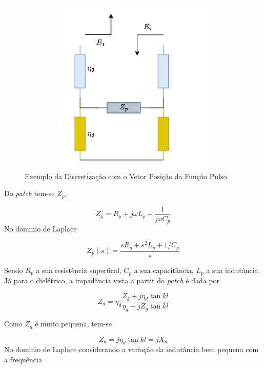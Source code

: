 \documentclass[
	12pt,				%
	openright,			%
	oneside,			%
	a4paper,			%
	english,			%
	brazil				%
	]{abntex2}
\begin{document}
\begin{figure}[htb]
 \label{PulsosVetorPosicaoIlustracao}
 \centering
  \begin{minipage}{\textwidth}
    \centering
    \caption{Exemplo da Discretização com o Vetor Posição da Função Pulso} \label{fig_minipage_imagem2}
    \includegraphics[width=14cm, height=8.5cm]{figures/AirTL2.png}
  \end{minipage}
  \hfill

\end{figure}
Do \textit{patch} tem-se $Z_p$,

\begin{equation}
Z_p=R_p+j\omega L_p+\frac{1}{j\omega C_p}
\end{equation}
No dominio de Laplace

\begin{equation}
Z_p(s)=\frac{sR_p+s^2 L_p+1/C_p}{s }
\end{equation}

Sendo $R_p$ a sua resistência superfical, $C_p$ a sua capacitância, $L_p$ a sua indutância. Já para o dielétrico, a impedância vista a partir do \textit{patch} é dada por


\begin{equation}
Z_d=\eta_d\frac{Z_g+j\eta_d \tan{kl}}{\eta_d+jZ_g\tan{kl}}
\end{equation}

Como $ Z_g$ é muito pequena, tem-se

\begin{equation}
Z_d=j\eta_d\tan{kl}=jX_d
\end{equation}
No dominio de Laplace
considerando a variação da indutância bem pequena com a frequência
\end{document}
